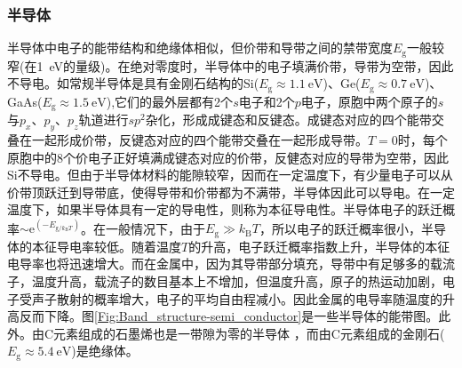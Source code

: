 \subsubsection{半导体} 
半导体中电子的能带结构和绝缘体相似，但价带和导带之间的禁带宽度$E_{\mathrm{g}}$一般较窄(在1~eV的量级)。在绝对零度时，半导体中的电子填满价带，导带为空带，因此不导电。如常规半导体是具有金刚石结构的Si($E_{\mathrm{g}}\approx1.1~\mathrm{eV}$)、Ge($E_{\mathrm{g}}\approx0.7~\mathrm{eV}$)、GaAs($E_{\mathrm{g}}\approx1.5~\mathrm{eV}$),它们的最外层都有2个$s$电子和2个$p$电子，原胞中两个原子的$s$与$p_x$、$p_y$、$p_z$轨道进行$sp^2$杂化，形成成键态和反键态。成键态对应的四个能带交叠在一起形成价带，反键态对应的四个能带交叠在一起形成导带。$T=0$时，每个原胞中的8个价电子正好填满成键态对应的价带，反健态对应的导带为空带，因此Si不导电。但由于半导体材料的能隙较窄，因而在一定温度下，有少量电子可以从价带顶跃迁到导带底，使得导带和价带都为不满带，半导体因此可以导电。在一定温度下，如果半导体具有一定的导电性，则称为本征导电性。半导体电子的跃迁概率$\sim\mathrm{e}^{(-E_{\mathrm{g}/k_{\mathrm{B}}T})}$。在一般情况下，由于$E_{\mathrm{g}}\gg k_{\mathrm{B}}T$，所以电子的跃迁概率很小，半导体的本征导电率较低。随着温度$T$的升高，电子跃迁概率指数上升，半导体的本征电导率也将迅速增大。而在金属中，因为其导带部分填充，导带中有足够多的载流子，温度升高，载流子的数目基本上不增加，但温度升高，原子的热运动加剧，电子受声子散射的概率增大，电子的平均自由程减小。因此金属的电导率随温度的升高反而下降。图\ref{Fig:Band_structure-semi_conductor}是一些半导体的能带图。此外。由C元素组成的石墨烯也是一带隙为零的半导体%
，而由C元素组成的金刚石($E_{\mathrm{g}}\approx5.4~\mathrm{eV}$)是绝缘体。

